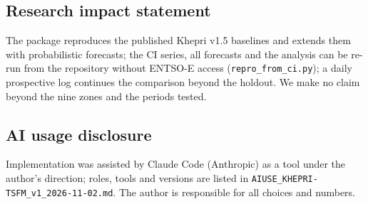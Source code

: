 \subsection{Research impact statement} The package reproduces the published Khepri v1.5 baselines and
extends them with probabilistic forecasts; the CI series, all forecasts and the analysis can be
re-run from the repository without ENTSO-E access (\texttt{repro\_from\_ci.py}); a daily
prospective log continues the comparison beyond the holdout. We make no claim beyond the nine
zones and the periods tested.

\subsection{AI usage disclosure} Implementation was assisted by Claude Code (Anthropic) as a tool
under the author's direction; roles, tools and versions are listed in
\texttt{AIUSE\_KHEPRI-TSFM\_v1\_2026-11-02.md}. The author is responsible for all choices and
numbers.
